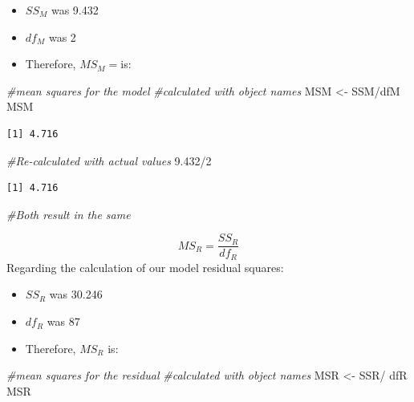 \documentclass[
  11pt,
]{book}
\newenvironment{Shaded}{\begin{snugshade}}{\end{snugshade}}
\newcommand{\CommentTok}[1]{\textcolor[rgb]{0.56,0.35,0.01}{\textit{#1}}}
\newcommand{\DecValTok}[1]{\textcolor[rgb]{0.00,0.00,0.81}{#1}}
\newcommand{\FloatTok}[1]{\textcolor[rgb]{0.00,0.00,0.81}{#1}}
\newcommand{\NormalTok}[1]{#1}
\newcommand{\OtherTok}[1]{\textcolor[rgb]{0.56,0.35,0.01}{#1}}
\newcommand{\SpecialCharTok}[1]{\textcolor[rgb]{0.00,0.00,0.00}{#1}}
\providecommand{\tightlist}{%
  \setlength{\itemsep}{0pt}\setlength{\parskip}{0pt}}
\begin{document}
\begin{itemize}
\tightlist
\item
  \(SS_M\) was 9.432
\item
  \(df_M\) was 2
\item
  Therefore, \(MS_M=\)is:
\end{itemize}

\begin{Shaded}
\begin{Highlighting}[]
\CommentTok{\#mean squares for the model}
\CommentTok{\#calculated with object names}
\NormalTok{MSM }\OtherTok{\textless{}{-}}\NormalTok{ SSM}\SpecialCharTok{/}\NormalTok{dfM}
\NormalTok{MSM}
\end{Highlighting}
\end{Shaded}

\begin{verbatim}
[1] 4.716
\end{verbatim}

\begin{Shaded}
\begin{Highlighting}[]
\CommentTok{\#Re{-}calculated with actual values }
\FloatTok{9.432}\SpecialCharTok{/}\DecValTok{2}
\end{Highlighting}
\end{Shaded}

\begin{verbatim}
[1] 4.716
\end{verbatim}

\begin{Shaded}
\begin{Highlighting}[]
\CommentTok{\#Both result in the same}
\end{Highlighting}
\end{Shaded}

\[MS_R = \frac{SS_{R}}{df{_{R}}}\]
Regarding the calculation of our model residual squares:

\begin{itemize}
\tightlist
\item
  \(SS_R\) was 30.246
\item
  \(df_R\) was 87
\item
  Therefore, \(MS_R\) is:
\end{itemize}

\begin{Shaded}
\begin{Highlighting}[]
\CommentTok{\#mean squares for the residual}
\CommentTok{\#calculated with object names }
\NormalTok{MSR }\OtherTok{\textless{}{-}}\NormalTok{ SSR}\SpecialCharTok{/}\NormalTok{ dfR}
\NormalTok{MSR}
\end{Highlighting}
\end{Shaded}
\end{document}

